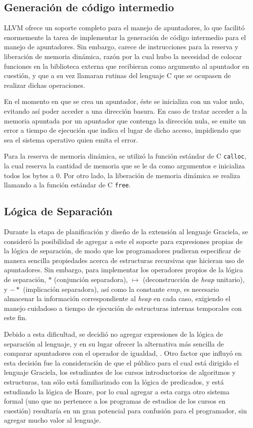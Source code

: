 {{\subsection{Generación de código intermedio}

LLVM ofrece un soporte completo para el manejo de apuntadores, lo que facilitó
enormemente la tarea de implementar la generación de código intermedio para el
manejo de apuntadores. Sin embargo, carece de instrucciones para la reserva y
liberación de memoria dinámica, razón por la cual hubo la necesidad de colocar
funciones en la biblioteca externa que recibieran como argumento al apuntador en
cuestión, y que a su vez llamaran rutinas del lenguaje C que se ocupasen de
realizar dichas operaciones.

En el momento en que se crea un apuntador, éste se inicializa con un valor nulo,
evitando así poder acceder a una dirección basura. En caso de tratar acceder a
la memoria apuntada por un apuntador que contenga la dirección nula, se emite un
error a tiempo de ejecución que indica el lugar de dicho acceso, impidiendo que
sea el sistema operativo quien emita el error.

Para la reserva de memoria dinámica, se utilizó la función estándar de C
\texttt{calloc}, la cual reserva la cantidad de memoria que se le da como
argumentos e inicializa todos los bytes a $0$. Por otro lado, la liberación de
memoria dinámica se realiza llamando a la función estándar de C \texttt{free}.

\subsection{Lógica de Separación}

Durante la etapa de planificación y diseño de la extensión al lenguaje Graciela,
se consideró la posibilidad de agregar a este el soporte para expresiones
propias de la lógica de separación, de modo que los programadores pudieran
especificar de manera sencilla propiedades acerca de estructuras recursivas que
hicieran uso de apuntadores. Sin embargo, para implementar los operadores
propios de la lógica de separación, $*$ (conjunción separadora), $\mapsto$
(deconstrucción de \textit{heap} unitario), y $-*$ (implicación separadora), así
como la constante $emp$, es necesario almacenar la información correspondiente
al \textit{heap} en cada caso, exigiendo el manejo cuidadoso a tiempo de
ejecución de estructuras internas temporales con este fin.

Debido a esta dificultad, se decidió no agregar expresiones de la lógica de
separación al lenguaje, y en su lugar ofrecer la alternativa más sencilla de
comparar apuntadores con el operador de igualdad, \ingra{==}. Otro factor que
influyó en esta decisión fue la consideración de que el público para el cual
está dirigido el lenguaje Graciela, los estudiantes de los cursos introductorios
de algoritmos y estructuras, tan sólo está familiarizado con la lógica de
predicados, y está estudiando la lógica de Hoare, por lo cual agregar a esta
carga otro sistema formal (uno que no pertenece a los programas de
estudios de los cursos en cuestión) resultaría en un gran potencial para
confusión para el programador, sin agregar mucho valor al lenguaje.


}}

